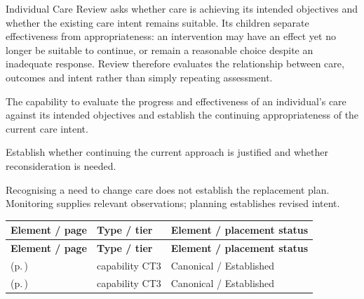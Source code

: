 Individual Care Review asks whether care is achieving its intended objectives and whether the existing care intent remains suitable. Its children separate effectiveness from appropriateness: an intervention may have an effect yet no longer be suitable to continue, or remain a reasonable choice despite an inadequate response. Review therefore evaluates the relationship between care, outcomes and intent rather than simply repeating assessment.



The capability to evaluate the progress and effectiveness of an individual's care against its intended objectives and establish the continuing appropriateness of the current care intent.



Establish whether continuing the current approach is justified and whether reconsideration is needed.



Recognising a need to change care does not establish the replacement plan. Monitoring supplies relevant observations; planning establishes revised intent.


\begingroup\small\setlength{\TableWidth}{\dimexpr\linewidth-6\tabcolsep-4\arrayrulewidth\relax}
\begin{longtable}{|>{\raggedright\arraybackslash}p{0.52\TableWidth}|>{\raggedright\arraybackslash}p{0.2\TableWidth}|>{\raggedright\arraybackslash}p{0.28\TableWidth}|}
\hline\rowcolor{TableHead}\textbf{Element / page} & \textbf{Type / tier} & \textbf{Element / placement status}\\\hline\endfirsthead
\hline\rowcolor{TableHead}\textbf{Element / page} & \textbf{Type / tier} & \textbf{Element / placement status}\\\hline\endhead
\hline\endfoot
\nameref{cap:bc-care-appropriateness-review} (p.\,\pageref{cap:bc-care-appropriateness-review}) & capability CT3 & Canonical / Established\\\hline
\nameref{cap:bc-care-effectiveness-review} (p.\,\pageref{cap:bc-care-effectiveness-review}) & capability CT3 & Canonical / Established\\\hline
\end{longtable}\endgroup

